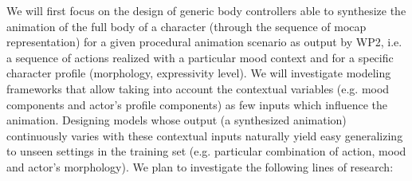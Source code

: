 We will first focus on the design of generic body controllers able to synthesize the animation of the full body of a character (through the sequence of mocap representation) for a given procedural animation scenario as output by WP2, i.e. a sequence of actions realized with a particular mood context and for a specific character profile (morphology, expressivity level). 
We will investigate modeling frameworks that allow taking into account the contextual variables (e.g. mood components and actor's profile components) as few inputs which influence the animation. 
Designing models whose output (a synthesized animation) continuously varies with these contextual inputs naturally yield easy generalizing to unseen settings in the training set (e.g. particular combination of action, mood and actor's morphology). We plan to investigate the following lines of research:




